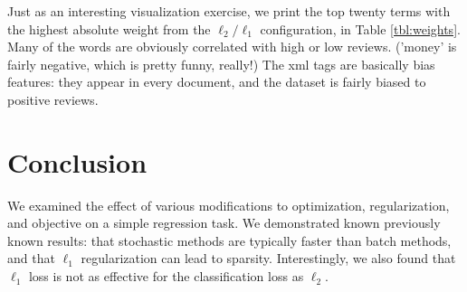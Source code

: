 \documentclass[11pt,leqno,twoside]{article}
\begin{document}
Just as an interesting visualization exercise, we print the top
twenty terms with the highest absolute weight from the $\ell_2/\ell_1$
configuration, in Table \ref{tbl:weights}. Many of the words are
obviously correlated with high or low reviews. ('money' is fairly
negative, which is pretty funny, really!) The xml tags are basically
bias features: they appear in every document, and the dataset is
fairly biased to positive reviews.

\section{Conclusion}

We examined the effect of various modifications to optimization, regularization, and objective
on a simple regression task. We demonstrated known previously known results: that stochastic
methods are typically faster than batch methods, and that $\ell_1$ regularization can lead to sparsity. Interestingly,
we also found that $\ell_1$ loss is not as effective for the classification loss as $\ell_2$.





\end{document}
